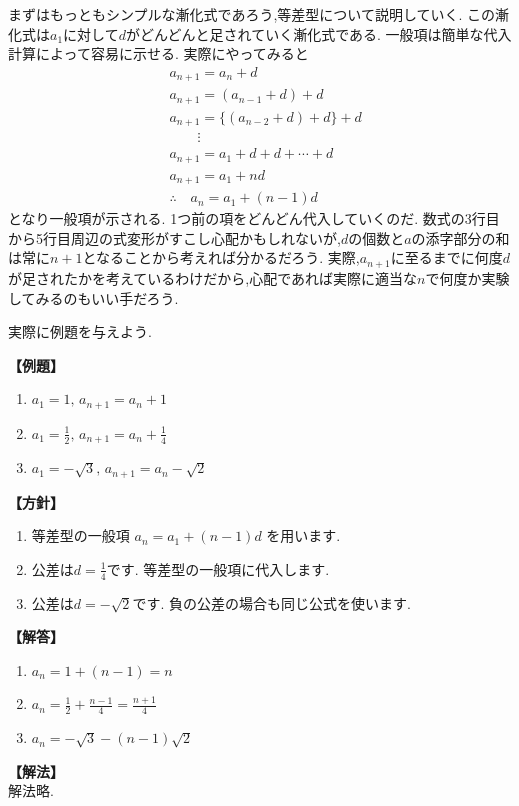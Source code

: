
まずはもっともシンプルな漸化式であろう,等差型について説明していく.
この漸化式は$a_1$に対して$d$がどんどんと足されていく漸化式である.
一般項は簡単な代入計算によって容易に示せる.
実際にやってみると
\begin{align*}
   & a_{n+1}=a_n+d                   \\
   & a_{n+1}=(a_{n-1}+d)+d           \\
   & a_{n+1}=\{(a_{n-2}+d)+d\}+d     \\
   & \qquad \vdots                   \\
   & a_{n+1}=a_1+d+d+\cdots+d        \\
   & a_{n+1}=a_1+nd                  \\
   & \therefore \quad a_n=a_1+(n-1)d
\end{align*}
となり一般項が示される.
1つ前の項をどんどん代入していくのだ.
数式の3行目から5行目周辺の式変形がすこし心配かもしれないが,$d$の個数と$a$の添字部分の和は常に$n+1$となることから考えれば分かるだろう.
実際,$a_{n+1}$に至るまでに何度$d$が足されたかを考えているわけだから,心配であれば実際に適当な$n$で何度か実験してみるのもいい手だろう.

実際に例題を与えよう.

\noindent \textbf{【例題】}
\begin{enumerate}[label=(\arabic*),parsep=3pt]
  \item $\displaystyle a_1=1,\, a_{n+1}=a_n+1$
  \item $\displaystyle a_1=\frac{1}{2},\, a_{n+1}=a_n+\frac{1}{4}$
  \item $\displaystyle a_1=-\sqrt{3},\, a_{n+1}=a_n-\sqrt{2}$
\end{enumerate}

\noindent\textbf{【方針】}
\begin{enumerate}[label=(\arabic*),parsep=3pt]
  \item 等差型の一般項
        $\displaystyle a_n=a_1+(n-1)d$
        を用います.
  \item 公差は$\displaystyle d=\frac14$です.
        等差型の一般項に代入します.
  \item 公差は$\displaystyle d=-\sqrt2$です.
        負の公差の場合も同じ公式を使います.
\end{enumerate}

\noindent\textbf{【解答】}
\begin{enumerate}[label=(\arabic*),parsep=3pt]
  \item $\displaystyle a_n=1+(n-1)=n$
  \item $\displaystyle a_n=\frac12+\frac{n-1}{4}
          =\frac{n+1}{4}$
  \item $\displaystyle a_n=-\sqrt3-(n-1)\sqrt2$
\end{enumerate}

\noindent\textbf{【解法】}\\
解法略.
